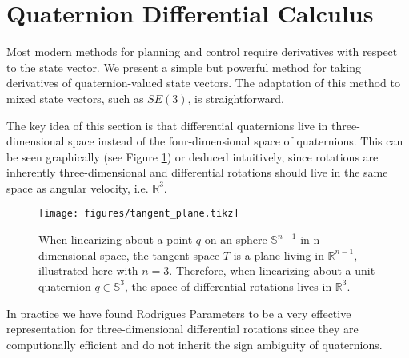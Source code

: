 \documentclass[letterpaper, 10 pt, conference]{ieeeconf}  %
\newcommand{\R}{\mathbb{R}}
\newcommand{\Q}{\mathbb{S}^3}
\newcommand{\q}{\textbf{q}}
\begin{document}

\section{Quaternion Differential Calculus} \label{sec:Quaternion_Calculus}
    Most modern methods for planning and control require derivatives with respect to the
    state vector. We present a simple but powerful method for taking derivatives of 
    quaternion-valued state vectors. The adaptation of this method to mixed state vectors,
    such as $SE(3)$, is straightforward.

    The key idea of this section is that differential quaternions live in three-dimensional
    space instead of the four-dimensional space of quaternions. This can be seen graphically
    (see Figure \ref{fig:tangent_plane}) or deduced intuitively, since rotations are
    inherently three-dimensional and differential rotations should live in the same space as 
    angular velocity, i.e. $\R^3$.

    \begin{figure}
        \centering
        \texttt{[image: figures/tangent\_plane.tikz]}
        \caption{
            When linearizing about a point $q$ on an sphere $\mathbb{S}^{n-1}$ in 
            n-dimensional space, the tangent space $T$ is a plane living in $\R^{n-1}$, 
            illustrated here with $n=3$. Therefore, when linearizing about a unit 
            quaternion $q \in \Q$, the space of differential rotations lives in $\R^3$.
        }
        \label{fig:tangent_plane}
    \end{figure}
    In practice we have found Rodrigues Parameters to be a very effective representation
    for three-dimensional differential rotations since they are computionally efficient
    and do not inherit the sign ambiguity of quaternions.
    
\end{document}
